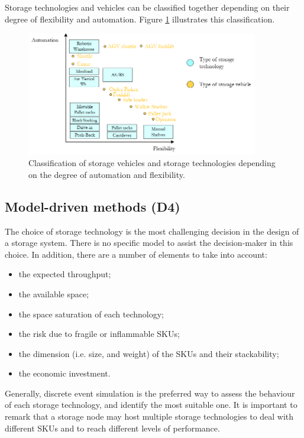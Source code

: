 \clearpage

Storage technologies and vehicles can be classified together depending on their degree of flexibility and automation. Figure \ref{fig_technologies} illustrates this classification.

\begin{figure}[hbt!]
\centering
\includegraphics[width=0.9\textwidth]{SectionWarehouses/design_figures/fig_technologies.png}
\captionsetup{type=figure}
\caption{Classification of storage vehicles and storage technologies depending on the degree of automation and flexibility.}
\label{fig_technologies}
\end{figure}

\subsection{Model-driven methods (D4)}
The choice of storage technology is the most challenging decision in the design of a storage system. There is no specific model to assist the decision-maker in this choice. In addition, there are a number of elements to take into account:

\begin{itemize}
    \item the expected throughput;
    \item the available space;
    \item the space saturation of each technology;
    \item the risk due to fragile or inflammable SKUs;
    \item the dimension (i.e. size, and weight) of the SKUs and their stackability;
    \item the economic investment.

\end{itemize}

Generally, discrete event simulation is the preferred way to assess the behaviour of each storage technology, and identify the most suitable one. It is important to remark that a storage node may host multiple storage technologies to deal with different SKUs and to reach different levels of performance.

